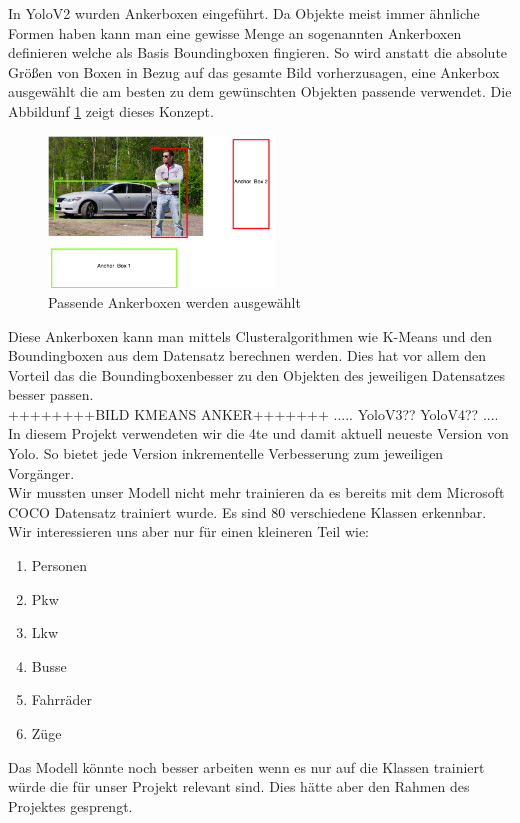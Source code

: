 \documentclass[conference]{IEEEtran}
\begin{document}
	In YoloV2 wurden Ankerboxen eingeführt. Da Objekte meist immer ähnliche Formen haben kann man eine gewisse Menge an sogenannten Ankerboxen definieren welche als Basis Boundingboxen fingieren. So wird anstatt die absolute Größen von Boxen in Bezug auf das gesamte Bild vorherzusagen, eine Ankerbox ausgewählt die am besten zu dem gewünschten Objekten passende verwendet. Die Abbildunf \ref{Anker} zeigt dieses Konzept.
	\begin{figure}[!h]
		\begin{center}
			\includegraphics[width=6cm]{Media/Ankerboxen.png}
			\caption{Passende Ankerboxen werden ausgewählt\cite{b0}}
			\label{Anker}
		\end{center}
	\end{figure}
	Diese Ankerboxen kann man mittels Clusteralgorithmen wie K-Means und den Boundingboxen aus dem Datensatz berechnen werden. Dies hat vor allem den Vorteil das die Boundingboxenbesser zu den Objekten des jeweiligen Datensatzes besser passen. \cite{b3}\\ ++++++++BILD KMEANS ANKER+++++++
	.....
	YoloV3??
	YoloV4??
	....
	In diesem Projekt verwendeten wir die 4te und damit aktuell neueste Version von Yolo\cite{b2}. So bietet jede Version inkrementelle Verbesserung zum jeweiligen Vorgänger.\\
	Wir mussten unser Modell nicht mehr trainieren da es bereits mit dem Microsoft COCO Datensatz trainiert wurde. Es sind 80 verschiedene Klassen erkennbar. Wir interessieren uns aber nur für einen kleineren Teil wie:
	\begin{enumerate}
		\item Personen
		\item Pkw
		\item Lkw
		\item Busse
		\item Fahrräder
		\item Züge
	\end{enumerate}
	Das Modell könnte noch besser arbeiten wenn es nur auf die Klassen trainiert würde die für unser Projekt relevant sind. Dies hätte aber den Rahmen des Projektes gesprengt.\\
\end{document}
